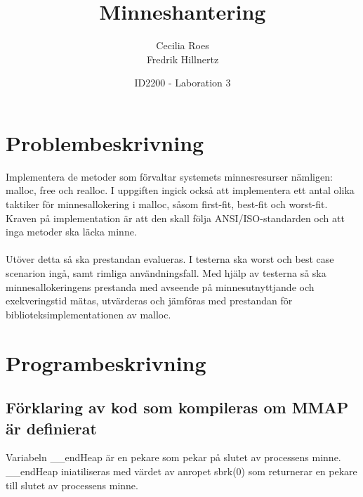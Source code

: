 \documentclass[a4paper]{article}
\title{Minneshantering}
\date{ID2200 - Laboration 3}
\author{Cecilia Roes \\ Fredrik Hillnertz}
\begin{document}

\maketitle

\section*{Problembeskrivning}
Implementera de metoder som förvaltar systemets minnesresurser nämligen: malloc, free och realloc. I uppgiften ingick också att implementera ett antal olika taktiker för minnesallokering i malloc, såsom first-fit, best-fit och worst-fit. Kraven på implementation är att den skall följa ANSI/ISO-standarden och att inga metoder ska läcka minne.
\\
\\
Utöver detta så ska prestandan evalueras. I testerna ska worst och best case scenarion ingå, samt rimliga användningsfall. Med hjälp av testerna så ska minnesallokeringens prestanda med avseende på minnesutnyttjande och exekveringstid mätas, utvärderas och jämföras med prestandan för biblioteksimplementationen av malloc.

\section*{Programbeskrivning}

\subsection*{Förklaring av kod som kompileras om MMAP är definierat}


Variabeln \_\_endHeap är en pekare som pekar på slutet av processens minne. \_\_endHeap iniatiliseras med värdet av anropet sbrk(0) som returnerar en pekare till slutet av processens minne.

%

\end{document}
